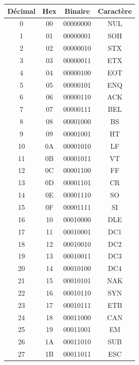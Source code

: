 \newpage

\begin{figure}[h!]
{\scriptsize
\begin{multicols}{2}
		\begin{tabular}{|c|c|c|c|}
			\hline
			Décimal     &Hex  &Binaire   &Caractère\\
			\hline
			0       &00   &00000000      &NUL  \\  
			1       &01   &00000001      &SOH   \\ 
			2       &02   &00000010      &STX    \\
			3       &03   &00000011      &ETX    \\
			4       &04   &00000100      &EOT    \\
			5       &05   &00000101      &ENQ    \\
			6       &06   &00000110      &ACK    \\
			7       &07   &00000111      &BEL    \\
			8       &08   &00001000       &BS    \\
			9       &09   &00001001       &HT    \\
			10      &0A   &00001010       &LF   \\
			11      &0B   &00001011       &VT   \\
			12      &0C   &00001100       &FF   \\
			13      &0D   &00001101       &CR   \\
			14      &0E   &00001110       &SO   \\
			15      &0F   &00001111       &SI   \\
			16      &10   &00010000      &DLE   \\
			17      &11   &00010001      &DC1   \\
			18      &12   &00010010      &DC2   \\
			19      &13   &00010011      &DC3   \\
			20      &14   &00010100      &DC4   \\
			21      &15   &00010101      &NAK   \\
			22      &16   &00010110      &SYN   \\
			23      &17   &00010111      &ETB   \\
			24      &18   &00011000      &CAN   \\
			25      &19   &00011001      &EM   \\
			26      &1A   &00011010      &SUB   \\
			27      &1B   &00011011      &ESC   \\

\end{tabular}
\end{multicols}}
\end{figure}
